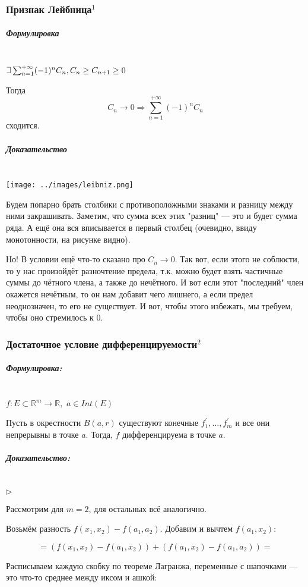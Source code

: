 \documentclass{article}
\def\letus{%
\mathord{\setbox0=\hbox{$\exists$}%
         \hbox{\kern 0.125\wd0%
               \vbox to \ht0{%
                  \hrule width 0.75\wd0%
                  \vfill%
                  \hrule width 0.75\wd0}%
               \vrule height \ht0%
               \kern 0.125\wd0}%
       }%
        }
\def\dbl{\,\,}
\let\vanillasubparagraph\subparagraph
\renewcommand{\subparagraph}[1]{\vanillasubparagraph{#1}\mbox{}\\}
\begin{document}
\subsubsection{Признак Лейбница\texorpdfstring{$^1$}{}}
\subparagraph{Формулировка}
$\letus \sum_{n=1}^{+\infty} (-1)^n C_n, C_n \ge C_{n+1} \ge 0$

Тогда
$$
C_n \rightarrow 0 \Rightarrow \sum_{n=1}^{+\infty} (-1)^n C_n
$$
сходится.

\subparagraph{Доказательство}
\texttt{[image: ../images/leibniz.png]}

Будем попарно брать столбики с противоположными знаками и разницу между ними закрашивать. Заметим, что сумма всех этих "разниц" --- это и будет сумма ряда. А ещё она вся вписывается в первый столбец (очевидно, ввиду монотонности, на рисунке видно).

Но! В условии ещё что-то сказано про $C_n \rightarrow 0$. Так вот, если этого не соблюсти, то у нас произойдёт разночтение предела, т.к. можно будет взять частичные суммы до чётного члена, а также до нечётного. И вот если этот "последний" член окажется нечётным, то он нам добавит чего лишнего, а если предел неоднозначен, то его не существует. И вот, чтобы этого избежать, мы требуем, чтобы оно стремилось к $0$.


\subsubsection{Достаточное условие дифференцируемости\texorpdfstring{$^2$}{}}

\subparagraph{Формулировка: }

$f : E \subset \mathbb{R}^m \rightarrow \mathbb{R}, \dbl a \in Int(E)$

Пусть в окрестности $B(a, r)$ существуют конечные $f^\prime_1, \ldots, f^\prime_m$ и все они непрерывны в точке $a$. Тогда, $f$ дифференцируема в точке $a$.

\subparagraph{Доказательство: }

$\rhd$

Рассмотрим для $m = 2$, для остальных всё аналогично.

Возьмём разность $f(x_1, x_2) - f(a_1, a_2)$. Добавим и вычтем $f(a_1, x_2)$:

\[ = \left(f(x_1, x_2) - f(a_1, x_2)\right) + \left(f(a_1, x_2) - f(a_1, a_2)\right) = \]

Расписываем каждую скобку по теореме Лагранжа, переменные с шапочками --- это что-то среднее между иксом и ашкой:
\end{document}
